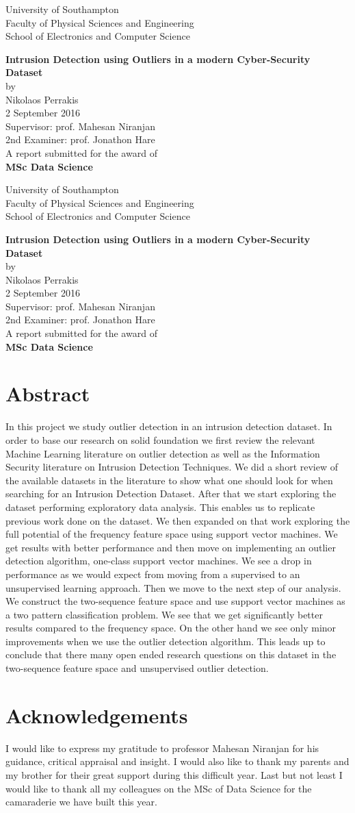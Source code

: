 \documentclass[reqno,openany,12pt]{amsbook}
\newcommand\mycustomtitle{%
\begin{titlepage}
\begin{center}
{\Large \textup{University of Southampton\\ \vspace{12pt}
	Faculty of Physical Sciences and Engineering\\ \vspace{12pt}
	School of Electronics and Computer Science}}\par
\vspace{72pt}
{\Large \textbf{
Intrusion Detection using Outliers in a modern Cyber-Security Dataset}
}\\
\vspace{36pt}
{\Large by}\\
\vspace{36pt}
{\Large Nikolaos Perrakis}
\\ \vspace{36pt}
{\Large 2 September 2016}
\\ \vspace{72pt}
{\Large
Supervisor: prof. Mahesan Niranjan\\ \vspace{8pt}
2nd Examiner: prof. Jonathon Hare}\\ \vspace{36pt}
{\Large A report submitted for the award of\\ \vspace{24pt}
\textbf{MSc Data Science}}
\end{center}
\end{titlepage}%
}
\begin{document}
\frontmatter
\mycustomtitle
\mycustomtitle


\afterpage{\null
	\thispagestyle{empty}
	\newpage} %



\chapter*{Abstract}
\setcounter{page}{1}

In this project we study outlier detection in an intrusion detection dataset. In order to base our research on solid foundation we first review the relevant Machine Learning literature on outlier detection  as well as the Information Security literature on Intrusion Detection Techniques. We did a short review of the available datasets in the literature to show what one should look for when searching for an Intrusion Detection Dataset. After that we start exploring the dataset performing exploratory data analysis. This enables us to replicate previous work done on the dataset. We then expanded on that work exploring the full potential of the frequency feature space using support vector machines. We get results with better performance and then move on implementing an outlier detection algorithm, one-class support vector machines. We see a drop in performance as we would expect from moving from a supervised to an unsupervised learning approach. Then we move to the next step of our analysis. We construct the two-sequence feature space and use support vector machines as a two pattern classification problem. We see that we get significantly better results compared to the frequency space. On the other hand we see only minor improvements when we use the outlier detection algorithm. This leads up to conclude that there many open ended research questions on this dataset in the two-sequence feature space and unsupervised outlier detection.



\chapter*{Acknowledgements}

I would like to express my gratitude to professor Mahesan Niranjan for his guidance, critical appraisal and insight. I would also like to thank my parents and my brother for their great support during this difficult year. Last but not least I would like to thank all my colleagues on the MSc of Data Science for the camaraderie we have built this year.
\end{document}

